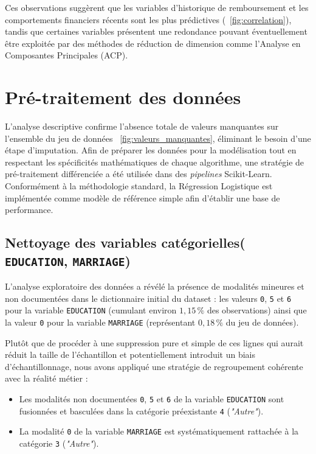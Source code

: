\documentclass{article}
\begin{document}
Ces observations suggèrent que les variables d'historique de remboursement et les comportements financiers récents sont les plus prédictives (~\ref{fig:correlation}), tandis que certaines variables présentent une redondance pouvant éventuellement être exploitée par des méthodes de réduction de dimension comme l'Analyse en Composantes Principales (ACP).

\section{Pré-traitement des données}

L'analyse descriptive confirme l'absence totale de valeurs manquantes sur l'ensemble du jeu de données ~\ref{fig:valeurs_manquantes}, éliminant le besoin d'une étape d'imputation. Afin de préparer les données pour la modélisation tout en respectant les spécificités mathématiques de chaque algorithme, une stratégie de pré-traitement différenciée a été utilisée dans des \textit{pipelines} Scikit-Learn. Conformément à la méthodologie standard, la Régression Logistique est implémentée comme modèle de référence simple afin d'établir une base de performance.

\subsection{Nettoyage des variables catégorielles( \texttt{EDUCATION}, \texttt{MARRIAGE})}
L'analyse exploratoire des données a révélé la présence de modalités mineures et non documentées dans le dictionnaire initial du dataset : les valeurs \texttt{0}, \texttt{5} et \texttt{6} pour la variable \texttt{EDUCATION} (cumulant environ $1,15\,\%$ des observations) ainsi que la valeur \texttt{0} pour la variable \texttt{MARRIAGE} (représentant $0,18\,\%$ du jeu de données). 

Plutôt que de procéder à une suppression pure et simple de ces lignes  qui aurait réduit la taille de l'échantillon et potentiellement introduit un biais d'échantillonnage, nous avons appliqué une stratégie de regroupement cohérente avec la réalité métier :
\begin{itemize}
    \item Les modalités non documentées \texttt{0}, \texttt{5} et \texttt{6} de la variable \texttt{EDUCATION} sont fusionnées et basculées dans la catégorie préexistante \texttt{4} (\textit{"Autre"}).
    \item La modalité \texttt{0} de la variable \texttt{MARRIAGE} est systématiquement rattachée à la catégorie \texttt{3} (\textit{"Autre"}).
\end{itemize}
\end{document}
